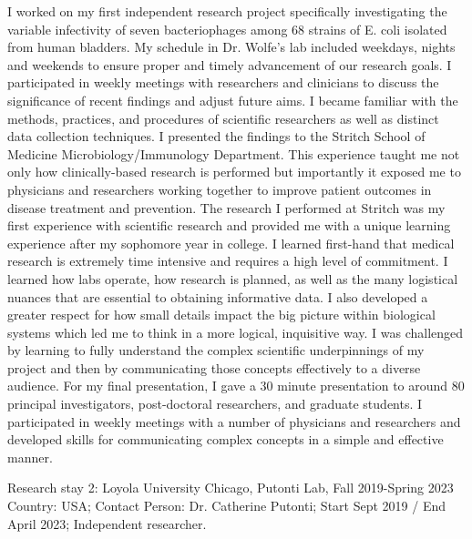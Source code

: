 {I worked on my first independent research project specifically investigating the variable infectivity of seven bacteriophages among 68
strains of E. coli isolated from human bladders. My schedule in Dr. Wolfe’s lab included weekdays, nights and weekends to ensure proper
and timely advancement of our research goals. I participated in weekly meetings with researchers and clinicians to discuss the
significance of recent findings and adjust future aims. I became familiar with the methods, practices, and procedures of scientific
researchers as well as distinct data collection techniques. I presented the findings to the Stritch School of Medicine
Microbiology/Immunology Department.
This experience taught me not only how clinically-based research is performed but importantly it exposed me to physicians and
researchers working together to improve patient outcomes in disease treatment and prevention. The research I performed at Stritch was
my first experience with scientific research and provided me with a unique learning experience after my sophomore year in college. I
learned first-hand that medical research is extremely time intensive and requires a high level of commitment. I learned how labs operate,
how research is planned, as well as the many logistical nuances that are essential to obtaining informative data. I also developed a
greater respect for how small details impact the big picture within biological systems which led me to think in a more logical, inquisitive
way. I was challenged by learning to fully understand the complex scientific underpinnings of my project and then by communicating
those concepts effectively to a diverse audience. For my final presentation, I gave a 30 minute presentation to around 80 principal
investigators, post-doctoral researchers, and graduate students. I participated in weekly meetings with a number of physicians and
researchers and developed skills for communicating complex concepts in a simple and effective manner.


Research stay 2: Loyola University Chicago, Putonti Lab, Fall 2019-Spring 2023
Country: USA; Contact Person: Dr. Catherine Putonti; Start Sept 2019 / End April 2023; Independent researcher.

}
